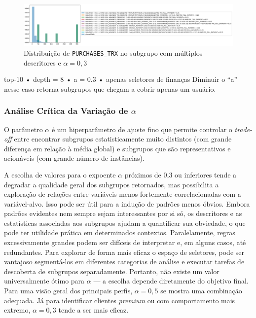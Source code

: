 \documentclass[12pt]{article}
\begin{document}
\begin{figure}[h]
    \centering
    \includegraphics[width=1\textwidth]{imagens/experimento2.2.png}
    \caption{Distribuição de \texttt{PURCHASES\_TRX} no subgrupo com múltiplos descritores e $\alpha = 0{,}3$}
    \label{fig:experimento2_1}
\end{figure}
top-10  •  depth = 8  •  a = 0.3  •  apenas seletores de finanças
Diminuir o “a” nesse caso retorna subgrupos que chegam a cobrir apenas um usuário.


\subsubsection{Análise Crítica da Variação de $\alpha$}

O parâmetro $\alpha$ é um hiperparâmetro de ajuste fino que permite controlar o \textit{trade-off} entre encontrar subgrupos estatisticamente muito distintos (com grande diferença em relação à média global) e subgrupos que são representativos e acionáveis (com grande número de instâncias).

A escolha de valores para o expoente $\alpha$ próximos de 0{,}3 ou inferiores tende a degradar a qualidade geral dos subgrupos retornados, mas possibilita a exploração de relações entre variáveis menos fortemente correlacionadas com a variável-alvo. Isso pode ser útil para a indução de padrões menos óbvios. Embora padrões evidentes nem sempre sejam interessantes por si só, os descritores e as estatísticas associadas aos subgrupos ajudam a quantificar sua obviedade, o que pode ter utilidade prática em determinados contextos. Paralelamente, regras excessivamente grandes podem ser difíceis de interpretar e, em alguns casos, até redundantes. Para explorar de forma mais eficaz o espaço de seletores, pode ser vantajoso segmentá-los em diferentes categorias de análise e executar tarefas de descoberta de subgrupos separadamente. Portanto, não existe um valor universalmente ótimo para $\alpha$ — a escolha depende diretamente do objetivo final. Para uma visão geral dos principais perfis, $\alpha = 0{,}5$ se mostra uma combinação adequada. Já para identificar clientes \textit{premium} ou com comportamento mais extremo, $\alpha = 0{,}3$ tende a ser mais eficaz.
\end{document}

